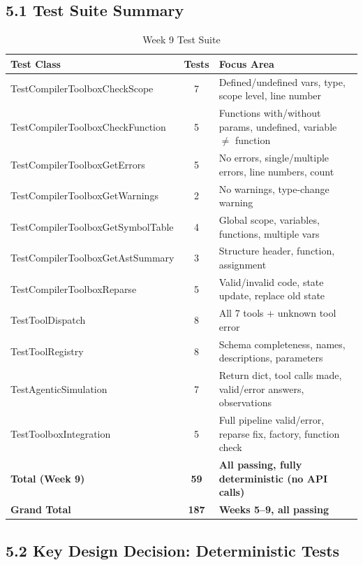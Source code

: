 \documentclass[a4paper,11pt]{article}
\begin{document}
\subsection{5.1 Test Suite Summary}

\begin{table}[h]
\centering
\begin{tabularx}{\textwidth}{|l|c|X|}
\hline
\rowcolor{blue!10}
\textbf{Test Class} & \textbf{Tests} & \textbf{Focus Area} \\
\hline
TestCompilerToolboxCheckScope & 7 & Defined/undefined vars, type, scope level, line number \\
\hline
TestCompilerToolboxCheckFunction & 5 & Functions with/without params, undefined, variable $\neq$ function \\
\hline
TestCompilerToolboxGetErrors & 5 & No errors, single/multiple errors, line numbers, count \\
\hline
TestCompilerToolboxGetWarnings & 2 & No warnings, type-change warning \\
\hline
TestCompilerToolboxGetSymbolTable & 4 & Global scope, variables, functions, multiple vars \\
\hline
TestCompilerToolboxGetAstSummary & 3 & Structure header, function, assignment \\
\hline
TestCompilerToolboxReparse & 5 & Valid/invalid code, state update, replace old state \\
\hline
TestToolDispatch & 8 & All 7 tools + unknown tool error \\
\hline
TestToolRegistry & 8 & Schema completeness, names, descriptions, parameters \\
\hline
TestAgenticSimulation & 7 & Return dict, tool calls made, valid/error answers, observations \\
\hline
TestToolboxIntegration & 5 & Full pipeline valid/error, reparse fix, factory, function check \\
\hline
\textbf{Total (Week 9)} & \textbf{59} & \textbf{All passing, fully deterministic (no API calls)} \\
\hline
\textbf{Grand Total} & \textbf{187} & \textbf{Weeks 5--9, all passing} \\
\hline
\end{tabularx}
\caption{Week 9 Test Suite}
\end{table}

\subsection{5.2 Key Design Decision: Deterministic Tests}
\end{document}
